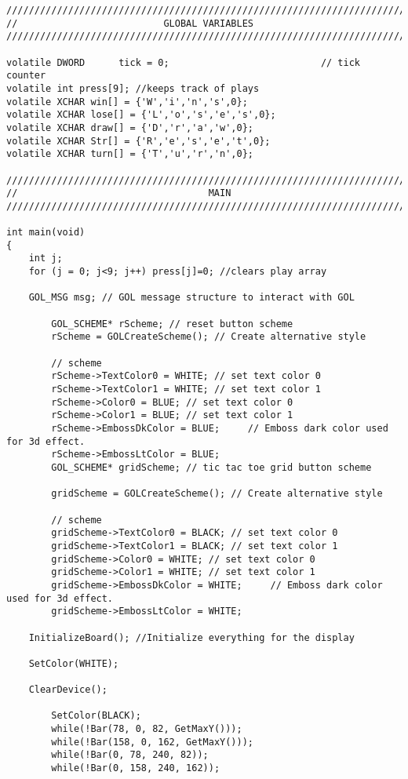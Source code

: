 \documentclass[12pt]{article}
\begin{document}
\begin{lstlisting}
/////////////////////////////////////////////////////////////////////////////
//                          GLOBAL VARIABLES
/////////////////////////////////////////////////////////////////////////////

volatile DWORD      tick = 0;                           // tick counter
volatile int press[9]; //keeps track of plays
volatile XCHAR win[] = {'W','i','n','s',0};
volatile XCHAR lose[] = {'L','o','s','e','s',0};
volatile XCHAR draw[] = {'D','r','a','w',0};
volatile XCHAR Str[] = {'R','e','s','e','t',0};
volatile XCHAR turn[] = {'T','u','r','n',0};

/////////////////////////////////////////////////////////////////////////////
//                                  MAIN
/////////////////////////////////////////////////////////////////////////////

int main(void)
{
    int j;
    for (j = 0; j<9; j++) press[j]=0; //clears play array

    GOL_MSG msg; // GOL message structure to interact with GOL

        GOL_SCHEME* rScheme; // reset button scheme
        rScheme = GOLCreateScheme(); // Create alternative style

        // scheme
        rScheme->TextColor0 = WHITE; // set text color 0
        rScheme->TextColor1 = WHITE; // set text color 1
        rScheme->Color0 = BLUE; // set text color 0
        rScheme->Color1 = BLUE; // set text color 1
        rScheme->EmbossDkColor = BLUE;     // Emboss dark color used for 3d effect.
        rScheme->EmbossLtColor = BLUE;
        GOL_SCHEME* gridScheme; // tic tac toe grid button scheme

        gridScheme = GOLCreateScheme(); // Create alternative style

        // scheme
        gridScheme->TextColor0 = BLACK; // set text color 0
        gridScheme->TextColor1 = BLACK; // set text color 1
        gridScheme->Color0 = WHITE; // set text color 0
        gridScheme->Color1 = WHITE; // set text color 1
        gridScheme->EmbossDkColor = WHITE;     // Emboss dark color used for 3d effect.
        gridScheme->EmbossLtColor = WHITE;
        
   	InitializeBoard(); //Initialize everything for the display

	SetColor(WHITE);

	ClearDevice();

        SetColor(BLACK);
        while(!Bar(78, 0, 82, GetMaxY()));
        while(!Bar(158, 0, 162, GetMaxY()));
        while(!Bar(0, 78, 240, 82));
        while(!Bar(0, 158, 240, 162));


\end{lstlisting}
\end{document}
